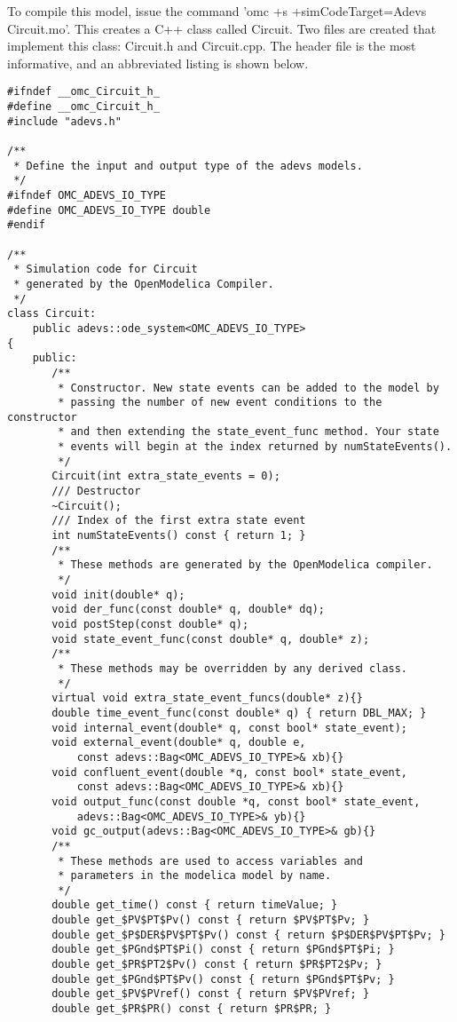 To compile this model, issue the command 'omc +s +simCodeTarget=Adevs Circuit.mo'. This creates a C++ class called Circuit. Two files are created that implement this class: Circuit.h and Circuit.cpp. The header file is the most informative, and an abbreviated listing is shown below.
\begin{verbatim}
#ifndef __omc_Circuit_h_
#define __omc_Circuit_h_
#include "adevs.h"

/**
 * Define the input and output type of the adevs models.
 */
#ifndef OMC_ADEVS_IO_TYPE
#define OMC_ADEVS_IO_TYPE double
#endif

/**
 * Simulation code for Circuit
 * generated by the OpenModelica Compiler.
 */
class Circuit:
    public adevs::ode_system<OMC_ADEVS_IO_TYPE>
{
    public:
       /**
        * Constructor. New state events can be added to the model by
        * passing the number of new event conditions to the constructor
        * and then extending the state_event_func method. Your state
        * events will begin at the index returned by numStateEvents().
        */
       Circuit(int extra_state_events = 0);
       /// Destructor
       ~Circuit();
       /// Index of the first extra state event
       int numStateEvents() const { return 1; }
       /**
        * These methods are generated by the OpenModelica compiler.
        */
       void init(double* q);
       void der_func(const double* q, double* dq);
       void postStep(const double* q);
       void state_event_func(const double* q, double* z);
       /**
        * These methods may be overridden by any derived class.
        */
       virtual void extra_state_event_funcs(double* z){}
       double time_event_func(const double* q) { return DBL_MAX; }
       void internal_event(double* q, const bool* state_event);
       void external_event(double* q, double e,
           const adevs::Bag<OMC_ADEVS_IO_TYPE>& xb){}
       void confluent_event(double *q, const bool* state_event,
           const adevs::Bag<OMC_ADEVS_IO_TYPE>& xb){}
       void output_func(const double *q, const bool* state_event,
           adevs::Bag<OMC_ADEVS_IO_TYPE>& yb){}
       void gc_output(adevs::Bag<OMC_ADEVS_IO_TYPE>& gb){}
       /**
        * These methods are used to access variables and
        * parameters in the modelica model by name.
        */
       double get_time() const { return timeValue; }
       double get_$PV$PT$Pv() const { return $PV$PT$Pv; }
       double get_$P$DER$PV$PT$Pv() const { return $P$DER$PV$PT$Pv; }
       double get_$PGnd$PT$Pi() const { return $PGnd$PT$Pi; }
       double get_$PR$PT2$Pv() const { return $PR$PT2$Pv; }
       double get_$PGnd$PT$Pv() const { return $PGnd$PT$Pv; }
       double get_$PV$PVref() const { return $PV$PVref; }
       double get_$PR$PR() const { return $PR$PR; }
       

\end{verbatim}
